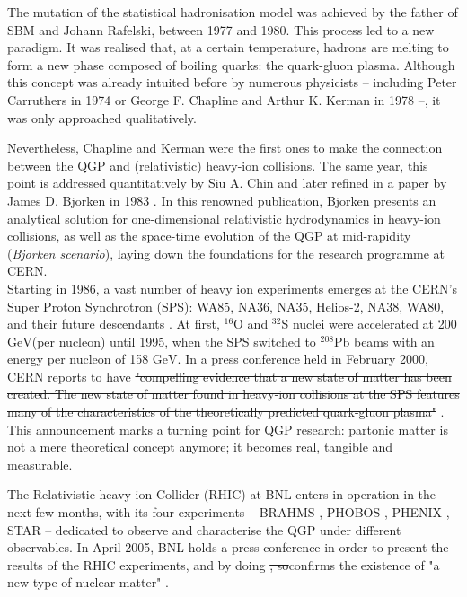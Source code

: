 \documentclass[ALICE,manyauthors]{cernphprep}
\newcommand {\unitStyle}[1] {\mbox{\ensuremath{\text{#1}}}}
\newcommand {\gev}      {\unitStyle{GeV}\xspace}
\providecommand{\DIFaddtex}[1]{{\protect\color{blue}\uwave{#1}}} %
\providecommand{\DIFdeltex}[1]{{\protect\color{red}\sout{#1}}}                      %
\providecommand{\DIFaddbegin}{} %
\providecommand{\DIFaddend}{} %
\providecommand{\DIFdelbegin}{} %
\providecommand{\DIFdelend}{} %
\providecommand{\DIFadd}[1]{\texorpdfstring{\DIFaddtex{#1}}{#1}} %
\providecommand{\DIFdel}[1]{\texorpdfstring{\DIFdeltex{#1}}{}} %
\newcommand{\DIFscaledelfig}{0.5}
\newlength{\DIFdelgraphicswidth} %
\newlength{\DIFdelgraphicsheight} %
\newcommand{\DIFaddincludegraphics}[2][]{{\color{blue}\fbox{\DIFOincludegraphics[#1]{#2}}}} %
\newcommand{\DIFdelincludegraphics}[2][]{%
\sbox{\DIFdelgraphicsbox}{\DIFOincludegraphics[#1]{#2}}%
\settoboxwidth{\DIFdelgraphicswidth}{\DIFdelgraphicsbox} %
\settoboxtotalheight{\DIFdelgraphicsheight}{\DIFdelgraphicsbox} %
\scalebox{\DIFscaledelfig}{%
\parbox[b]{\DIFdelgraphicswidth}{\usebox{\DIFdelgraphicsbox}\\[-\baselineskip] \rule{\DIFdelgraphicswidth}{0em}}\llap{\resizebox{\DIFdelgraphicswidth}{\DIFdelgraphicsheight}{%
\setlength{\unitlength}{\DIFdelgraphicswidth}%
\begin{picture}(1,1)%
\thicklines\linethickness{2pt} %
{\color[rgb]{1,0,0}\put(0,0){\framebox(1,1){}}}%
{\color[rgb]{1,0,0}\put(0,0){\line( 1,1){1}}}%
{\color[rgb]{1,0,0}\put(0,1){\line(1,-1){1}}}%
\end{picture}%
}\hspace*{3pt}}} %
} %
\DeclareRobustCommand{\DIFaddbegin}{\DIFOaddbegin \let\includegraphics\DIFaddincludegraphics} %
\DeclareRobustCommand{\DIFaddend}{\DIFOaddend \let\includegraphics\DIFOincludegraphics} %
\DeclareRobustCommand{\DIFdelbegin}{\DIFOdelbegin \let\includegraphics\DIFdelincludegraphics} %
\DeclareRobustCommand{\DIFdelend}{\DIFOaddend \let\includegraphics\DIFOincludegraphics} %
\begin{document}
The mutation of the statistical hadronisation model was achieved by the father of SBM and Johann Rafelski, between 1977 and 1980. This process led to a new paradigm. It was realised that, at a certain temperature, hadrons are melting to form a new phase composed of boiling quarks: the quark-gluon plasma. Although this concept was already intuited before by numerous physicists -- including Peter Carruthers in 1974 \cite{rafelskiMeltingHadronsBoiling2015} or George F. Chapline and Arthur K. Kerman in 1978 \cite{chaplinePossibilityMakingQuark1978} --, it was only approached qualitatively.

Nevertheless, Chapline and Kerman were the first ones to make the connection between the QGP and (relativistic) heavy-ion collisions. The same year, this point is addressed quantitatively by Siu A. Chin\cite{chinTransitionHotQuark1978a} and later refined in a paper by James D. Bjorken in 1983 \cite{bjorkenHighlyRelativisticNucleusnucleus1983}. In this renowned publication, Bjorken presents an analytical solution for one-dimensional relativistic hydrodynamics in heavy-ion collisions, as well as the space-time evolution of the QGP at mid-rapidity (\textit{Bjorken scenario}), laying down the foundations for the research programme at CERN.\\

Starting in 1986, a vast number of heavy ion experiments emerges at the CERN's Super Proton Synchrotron (SPS): WA85, NA36, NA35, Helios-2, NA38, WA80, and their future descendants \cite{satzSPSHeavyIon2004}. At first, $^{16}$O and $^{32}$S nuclei were accelerated at 200 \gev (per nucleon) until 1995, when the SPS switched to $^{208}$Pb beams with an energy per nucleon of 158 \gev. In a press conference held in February 2000, CERN reports to have \DIFdelbegin \DIFdel{"compelling evidence that a new state of matter has been created. The new state of matter found in heavy-ion collisions at the SPS features many of the characteristics of the theoretically predicted quark-gluon plasma" }\DIFdelend \DIFaddbegin {} \DIFaddend \cite{NewStateMatter2023}. This announcement marks a turning point for QGP research: partonic matter is not a mere theoretical concept anymore; it becomes real, tangible and measurable. 

The Relativistic heavy-ion Collider (RHIC) at BNL enters in operation in the next few months, with its four experiments -- BRAHMS \cite{arseneQuarkGluonPlasma2005}, PHOBOS \cite{alPHOBOSPerspectiveDiscoveries2005}, PHENIX \cite{phenixcollaborationFormationDensePartonic2005}, STAR \cite{starcollaborationExperimentalTheoreticalChallenges2005} -- dedicated to observe and characterise the QGP under different observables. In April 2005, BNL holds a press conference in order to present the results of the RHIC experiments, and by doing \DIFdelbegin \DIFdel{, so}\DIFdelend \DIFaddbegin \DIFadd{so, }\DIFaddend confirms the existence of "a new type of nuclear matter" \cite{ludlamHUNTINGQUARKGLUON2005}.
\end{document}
